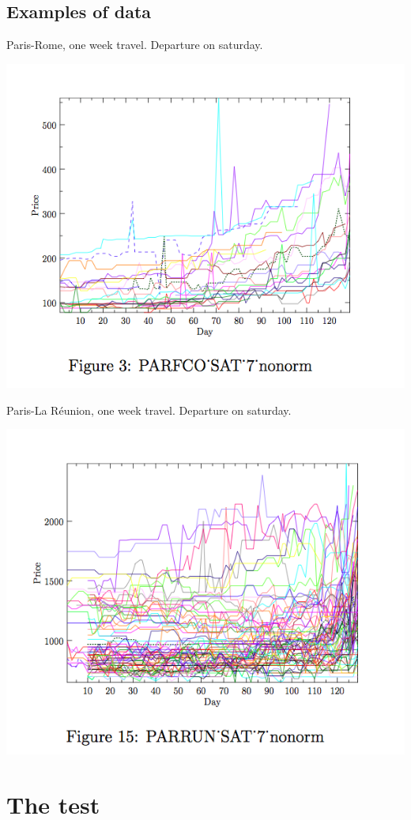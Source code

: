 \documentclass{beamer}
\begin{document}
\subsection{Examples of data} 
\frame 
{ 
Paris-Rome, one week travel. Departure on saturday.
\vspace{-0.4cm}
\begin{center}
\includegraphics[width=7.cm]{picture1.png}
\end{center}
\vspace{-0.4cm}
}
\frame 
{ 
Paris-La R\'eunion, one week travel. Departure on saturday.
\vspace{-0.4cm}
\begin{center}
\includegraphics[width=7.cm]{picture2.png}
\end{center}
\vspace{-0.4cm}
}

\section{The test}
\end{document}
